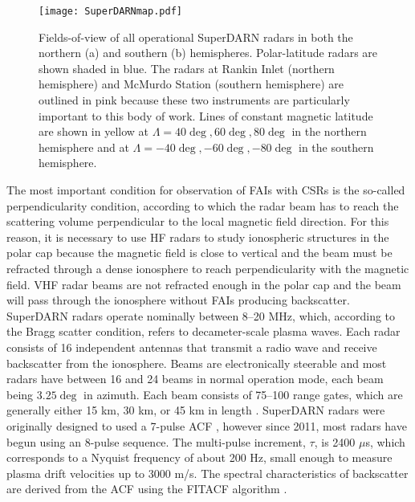 \begin{figure}
	\centering
	\texttt{[image: SuperDARNmap.pdf]}
	\caption[SuperDARN map]{Fields-of-view of all operational SuperDARN radars in both the northern (a) and southern (b) hemispheres.  Polar-latitude radars are shown shaded in blue.  The radars at Rankin Inlet (northern hemisphere) and McMurdo Station (southern hemisphere) are outlined in pink because these two instruments are particularly important to this body of work.  Lines of constant magnetic latitude are shown in yellow at \(\Lambda = 40\deg, 60\deg, 80\deg\) in the northern hemisphere and at \(\Lambda = -40\deg,-60\deg,-80\deg\) in the southern hemisphere.}
	\label{fig:superdarnmap}
\end{figure}

The most important condition for observation of FAIs with CSRs is the so-called perpendicularity condition, according to which the radar beam has to reach the scattering volume perpendicular to the local magnetic field direction.  For this reason, it is necessary to use HF radars to study ionospheric structures in the polar cap because the magnetic field is close to vertical and the beam must be refracted through a dense ionosphere to reach perpendicularity with the magnetic field.  VHF radar beams are not refracted enough in the polar cap and the beam will pass through the ionosphere without FAIs producing backscatter.  SuperDARN radars operate nominally between 8--20 MHz, which, according to the Bragg scatter condition, refers to decameter-scale plasma waves.  Each radar consists of 16 independent antennas that transmit a radio wave and receive backscatter from the ionosphere.  Beams are electronically steerable and most radars have between 16 and 24 beams in normal operation mode, each beam being \(3.25\deg\) in azimuth.  Each beam consists of 75--100 range gates, which are generally either 15 km, 30 km, or 45 km in length \citep{Chisham2007}.  SuperDARN radars were originally designed to used a 7-pulse ACF \citep{Farley1972,Greenwald1983,Greenwald1985}, however since 2011, most radars have begun using an 8-pulse sequence.   The multi-pulse increment, \(\tau\), is 2400 \(\mu\)s, which corresponds to a Nyquist frequency of about 200 Hz, small enough to measure plasma drift velocities up to 3000 m/s.  The spectral characteristics of backscatter are derived from the ACF using the FITACF algorithm \citep{Ponomarenko2006}.

